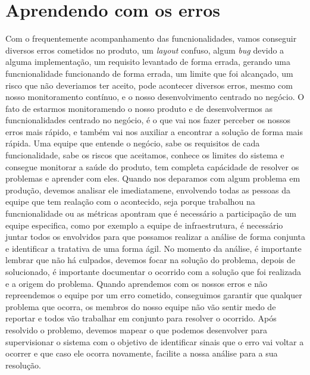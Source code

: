     \section{Aprendendo com os erros}
      Com o frequentemente acompanhamento das funcnionalidades, vamos conseguir
      diversos erros cometidos no produto, um \textit{layout} confuso, algum
      \textit{bug} devido a alguma implementação, um requisito levantado de
      forma errada, gerando uma funcnionalidade funcionando de forma errada, um
      limite que foi alcançado, um risco que não deveriamos ter aceito, pode
      acontecer diversos erros, mesmo com nosso monitoramento contínuo, e o nosso
      desenvolvimento centrado no negócio. O fato de estarmos monitoramendo o nosso
      produto e de desenvolvermos as funcnionalidades centrado no negócio, é o que
      vai nos fazer perceber os nossos erros mais rápido, e também vai nos auxiliar
      a encontrar a solução de forma mais rápida. Uma equipe que entende o negócio,
      sabe os requisitos de cada funcionalidade, sabe os riscos que aceitamos,
      conhece os limites do sistema e consegue monitorar a saúde do produto, tem
      completa capácidade de resolver os problemas e aprender com eles. \newline
      Quando nos deparamos com algum problema em produção, devemos analisar ele
      imediatamene, envolvendo todas as pessoas da equipe que tem realação com o
      acontecido, seja porque trabalhou na funcnionalidade ou as métricas apontram
      que é necessário a participação de um equipe especifica, como por exemplo a
      equipe de infraestrutura, é necessário juntar todos os envolvidos para que
      possamos realizar a análise de forma conjunta e identificar a tratativa de
      uma forma ágil. No momento da análise, é importante lembrar que não há
      culpados, devemos focar na solução do problema, depois de solucionado, é
      importante documentar o ocorrido com a solução que foi realizada e a origem
      do problema. Quando aprendemos com os nossos erros e não repreendemos o
      equipe por um erro cometido, conseguimos garantir que qualquer problema que
      ocorra, os membros do nosso equipe não vão sentir medo de reportar e todos vão
      trabalhar em conjunto para resolver o ocorrido. Após resolvido o problemo,
      devemos mapear o que podemos desenvolver para supervisionar o sistema com o
      objetivo de identificar sinais que o erro vai voltar a ocorrer e que caso
      ele ocorra novamente, facilite a nossa análise para a sua resolução. \newline

